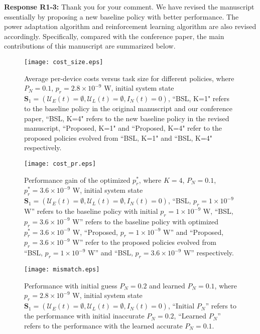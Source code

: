 \documentclass[12pt,onecolumn]{IEEEtran}
\newcommand{\blue}{\color{blue}}
\newcommand{\spaceblank}{\vskip 4mm}
\begin{document}
\spaceblank
{\blue \textbf{Response R1-3:} Thank you for your comment. We have revised the manuscript essentially by proposing a new baseline policy with better performance. The power adaptation algorithm and reinforcement learning algorithm are also revised accordingly. Specifically, compared with the conference paper, the main contributions of this manuscript are summarized below.

\begin{figure}[tb]
	\centering
	\texttt{[image: cost\_size.eps]}
	\caption{Average per-device costs versus task size for different policies, where $P_N=0.1$, $p_r=2.8\times 10^{-9}$ W, initial system state $\mathbf S_1=(\mathcal U_E(t)=\emptyset, \mathcal U_L(t)=\emptyset, I_N(t)=0)$, ``BSL, K=1" refers to the baseline policy in the original manuscript and our conference paper, ``BSL, K=4" refers to the new baseline policy in the revised manuscript, ``Proposed, K=1" and ``Proposed, K=4" refer to the proposed policies evolved from ``BSL, K=1" and ``BSL, K=4" respectively.}
	\label{fig:cost_size}
\end{figure}


\begin{figure}[tb]
	\centering
	\texttt{[image: cost\_pr.eps]}
	\caption{Performance gain of the optimized $p_r^*$, where $K=4$, $P_N=0.1$, $p_r^*=3.6\times 10^{-9}$ W, initial system state $\mathbf S_1=(\mathcal U_E(t)=\emptyset, \mathcal U_L(t)=\emptyset, I_N(t)=0)$, ``BSL, $p_r=1\times 10^{-9}$ W'' refers to the baseline policy with initial $p_r=1\times 10^{-9}$ W, ``BSL, $p_r=3.6\times 10^{-9}$ W'' refers to the baseline policy with optimized $p_r^*=3.6\times 10^{-9}$ W, ``Proposed, $p_r=1\times 10^{-9}$ W'' and ``Proposed, $p_r=3.6\times 10^{-9}$ W'' refer to the proposed policies evolved from ``BSL, $p_r=1\times 10^{-9}$ W'' and ``BSL, $p_r=3.6\times 10^{-9}$ W'' respectively.}
	\label{fig:cost_pr}
\end{figure}

\begin{figure}[tb]
	\centering
	\texttt{[image: mismatch.eps]}
	\caption{Performance with initial guess $P_N=0.2$ and learned $P_N=0.1$, where $p_r=2.8\times 10^{-9}$ W, initial system state $\mathbf S_1=(\mathcal U_E(t)=\emptyset, \mathcal U_L(t)=\emptyset, I_N(t)=0)$, ``Initial $P_N$'' refers to the performance with initial inaccurate $P_N=0.2$, ``Learned $P_N$'' refers to the performance with the learned accurate $P_N=0.1$.}
	\label{fig:mismatch}
\end{figure}


}
\end{document}
